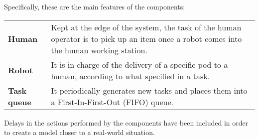 Specifically, these are the main features of the components:
\vspace{0,5cm}

\begin{tabularx}{\textwidth}{lX}
\textbf{Human} & Kept at the edge of the system, the task of the human operator is to pick up an item once a robot comes into the human working station.\vspace{0,2cm}\\
\textbf{Robot} & It is in charge of the delivery of a specific pod to a human, according to what specified in a task.\vspace{0,2cm}\\
\textbf{Task queue} & It periodically generates new tasks and places them into a First-In-First-Out (FIFO) queue.\vspace{0,2cm}\\
\end{tabularx}

Delays in the actions performed by the components have been included in order to create a model closer to a real-world situation.